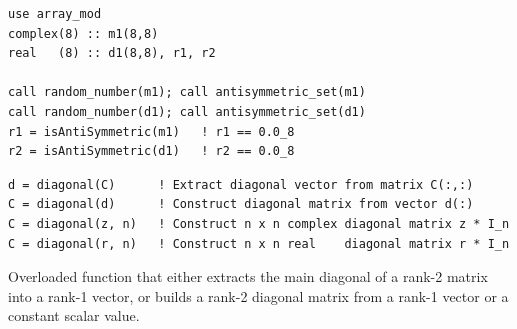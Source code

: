 \begin{description}[leftmargin=2.2cm, style=nextline]
\end{description}

\lstset{language=[95]Fortran}
\begin{lstlisting}
use array_mod
complex(8) :: m1(8,8)
real   (8) :: d1(8,8), r1, r2

call random_number(m1); call antisymmetric_set(m1)
call random_number(d1); call antisymmetric_set(d1)
r1 = isAntiSymmetric(m1)   ! r1 == 0.0_8
r2 = isAntiSymmetric(d1)   ! r2 == 0.0_8
\end{lstlisting}


\lstset{language=[95]Fortran}
\begin{lstlisting}
d = diagonal(C)      ! Extract diagonal vector from matrix C(:,:)
C = diagonal(d)      ! Construct diagonal matrix from vector d(:)
C = diagonal(z, n)   ! Construct n x n complex diagonal matrix z * I_n
C = diagonal(r, n)   ! Construct n x n real    diagonal matrix r * I_n
\end{lstlisting}

Overloaded function that either extracts the main diagonal of a rank-2 matrix into a rank-1 vector, or builds a rank-2 diagonal matrix from a rank-1 vector or a constant scalar value.

